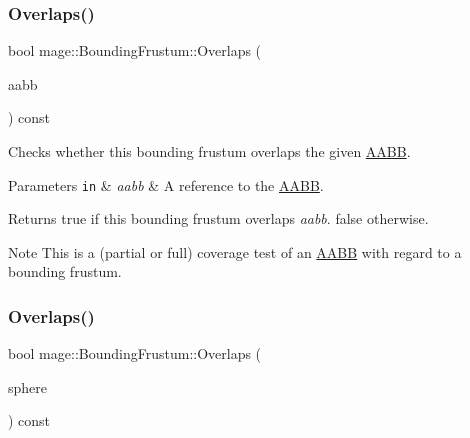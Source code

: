\subsubsection{\texorpdfstring{Overlaps()}{Overlaps()}\hspace{0.1cm}{\footnotesize\ttfamily [1/2]}}
{\footnotesize\ttfamily bool mage\+::\+Bounding\+Frustum\+::\+Overlaps (\begin{DoxyParamCaption}\item[{const \hyperlink{classmage_1_1_a_a_b_b}{A\+A\+BB} \&}]{aabb }\end{DoxyParamCaption}) const\hspace{0.3cm}{\ttfamily [noexcept]}}

Checks whether this bounding frustum overlaps the given \hyperlink{classmage_1_1_a_a_b_b}{A\+A\+BB}.


\begin{DoxyParams}[1]{Parameters}
\mbox{\tt in}  & {\em aabb} & A reference to the \hyperlink{classmage_1_1_a_a_b_b}{A\+A\+BB}. \\
\hline
\end{DoxyParams}
\begin{DoxyReturn}{Returns}
{\ttfamily true} if this bounding frustum overlaps {\itshape aabb}. {\ttfamily false} otherwise. 
\end{DoxyReturn}
\begin{DoxyNote}{Note}
This is a (partial or full) coverage test of an \hyperlink{classmage_1_1_a_a_b_b}{A\+A\+BB} with regard to a bounding frustum. 
\end{DoxyNote}
\hypertarget{classmage_1_1_bounding_frustum_a2133c3a7187369772e82b7e229b0e683}{}\label{classmage_1_1_bounding_frustum_a2133c3a7187369772e82b7e229b0e683} 
\subsubsection{\texorpdfstring{Overlaps()}{Overlaps()}\hspace{0.1cm}{\footnotesize\ttfamily [2/2]}}
{\footnotesize\ttfamily bool mage\+::\+Bounding\+Frustum\+::\+Overlaps (\begin{DoxyParamCaption}\item[{const \hyperlink{classmage_1_1_bounding_sphere}{Bounding\+Sphere} \&}]{sphere }\end{DoxyParamCaption}) const\hspace{0.3cm}{\ttfamily [noexcept]}}

